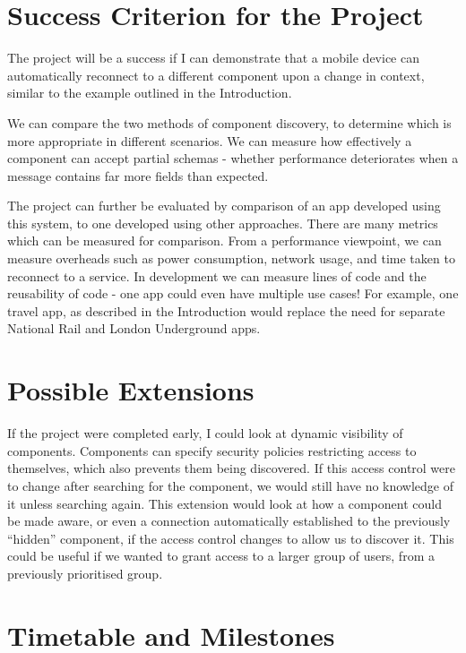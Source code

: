 \section*{Success Criterion for the Project}


The project will be a success if I can demonstrate that a mobile device can automatically reconnect to a different component upon a change in context, similar to the example outlined in the Introduction.

We can compare the two methods of component discovery, to determine which is more appropriate in different scenarios. We can measure how effectively a component can accept partial schemas - whether performance deteriorates when a message contains far more fields than expected.

The project can further be evaluated by comparison of an app developed using this system, to one developed using other approaches. There are many metrics which can be measured for comparison. From a performance viewpoint, we can measure overheads such as power consumption, network usage, and time taken to reconnect to a service.
In development we can measure lines of code and the reusability of code - one app could even have multiple use cases! For example, one travel app, as described in the Introduction would replace the need for separate National Rail and London Underground apps.



\section*{Possible Extensions}

If the project were completed early, I could look at dynamic visibility of components. Components can specify security policies restricting access to themselves, which also prevents them being discovered. If this access control were to change after searching for the component, we would still have no knowledge of it unless searching again. This extension would look at how a component could be made aware, or even a connection automatically established to the previously ``hidden'' component, if the access control changes to allow us to discover it. This could be useful if we wanted to grant access to a larger group of users, from a previously prioritised group.


\section*{Timetable and Milestones}

